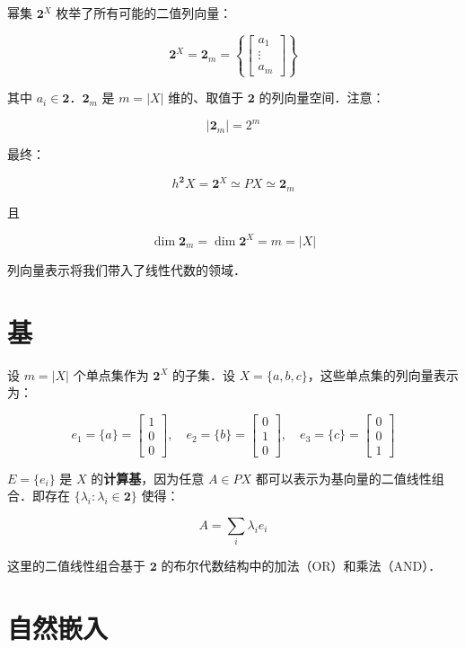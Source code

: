\documentclass[10pt, openany]{book}
\begin{document}
幂集 $\mathbf{2}^X$ 枚举了所有可能的二值列向量：

$$
\mathbf{2}^X = \mathbf{2}_m = \left\{ \begin{bmatrix}a_1 \\ \vdots \\ a_m\end{bmatrix} \right\}
$$

其中 $a_i \in \mathbf{2}$．$\mathbf{2}_m$ 是 $m = |X|$ 维的、取值于 $\mathbf{2}$ 的列向量空间．注意：

$$
|\mathbf{2}_m| = 2^m
$$

最终：

$$
h^{\mathbf{2}} X = \mathbf{2}^X \simeq PX \simeq \mathbf{2}_m
$$

且

$$
\dim \mathbf{2}_m = \dim \mathbf{2}^X = m = |X|
$$

列向量表示将我们带入了线性代数的领域．

\section{基}

设 $m = |X|$ 个单点集作为 $\mathbf{2}^X$ 的子集．设 $X = \{a,b,c\}$，这些单点集的列向量表示为：

$$
e_1 = \{a\} = \begin{bmatrix}1\\0\\0\end{bmatrix},\quad 
e_2 = \{b\} = \begin{bmatrix}0\\1\\0\end{bmatrix},\quad 
e_3 = \{c\} = \begin{bmatrix}0\\0\\1\end{bmatrix}
$$

$E = \{e_i\}$ 是 $X$ 的\textbf{计算基}，因为任意 $A \in PX$ 都可以表示为基向量的二值线性组合．即存在 $\{\lambda_i: \lambda_i \in \mathbf{2}\}$ 使得：

$$
A = \sum_i \lambda_i e_i
$$

这里的二值线性组合基于 $\mathbf{2}$ 的布尔代数结构中的加法（OR）和乘法（AND）．

\section{自然嵌入}
\end{document}
